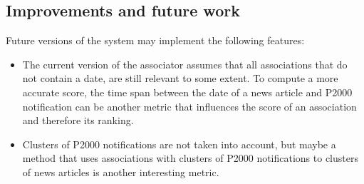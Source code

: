 \subsection*{Improvements and future work}
Future versions of the system may implement the following features:
\begin{itemize}
\item The current version of the associator assumes that all associations that do not contain a date, are still relevant to some extent. To compute a more accurate score, the time span between the date of a news article and P2000 notification can be another metric that influences the score of an association and therefore its ranking.
\item Clusters of P2000 notifications are not taken into account, but maybe a method that uses associations with clusters of P2000 notifications to clusters of news articles is another interesting metric.
\end{itemize}

